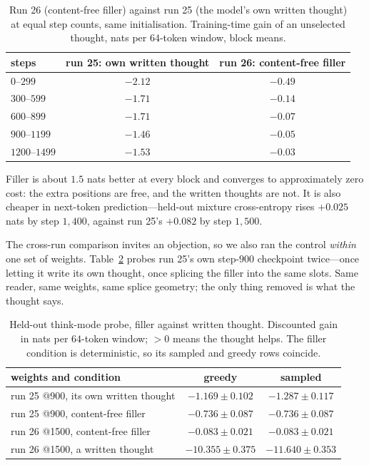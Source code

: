 \documentclass{article} %
\begin{document}
\begin{table}[h]
\centering
\caption{Run 26 (content-free filler) against run 25 (the model's own written thought) at equal step counts, same initialisation. Training-time gain of an unselected thought, nats per $64$-token window, block means.}
\label{tab:run26}
\begin{tabular}{lcc}
\toprule
steps & run 25: own written thought & run 26: content-free filler \\
\midrule
$0$--$299$       & $-2.12$ & $\mathbf{-0.49}$ \\
$300$--$599$     & $-1.71$ & $\mathbf{-0.14}$ \\
$600$--$899$     & $-1.71$ & $\mathbf{-0.07}$ \\
$900$--$1199$    & $-1.46$ & $\mathbf{-0.05}$ \\
$1200$--$1499$   & $-1.53$ & $\mathbf{-0.03}$ \\
\bottomrule
\end{tabular}
\end{table}

Filler is about $1.5$ nats better at every block and converges to approximately zero cost: the extra positions are free, and the written thoughts are not. It is also cheaper in next-token prediction---held-out mixture cross-entropy rises $+0.025$ nats by step $1{,}400$, against run 25's $+0.082$ by step $1{,}500$.

The cross-run comparison invites an objection, so we also ran the control \emph{within} one set of weights. Table~\ref{tab:run26probe} probes run 25's own step-$900$ checkpoint twice---once letting it write its own thought, once splicing the filler into the same slots. Same reader, same weights, same splice geometry; the only thing removed is what the thought says.

\begin{table}[h]
\centering
\caption{Held-out think-mode probe, filler against written thought. Discounted gain in nats per $64$-token window; $>0$ means the thought helps. The filler condition is deterministic, so its sampled and greedy rows coincide.}
\label{tab:run26probe}
\begin{tabular}{lcc}
\toprule
weights and condition & greedy & sampled \\
\midrule
run 25 @900, its own written thought & $-1.169 \pm 0.102$ & $-1.287 \pm 0.117$ \\
run 25 @900, content-free filler     & $-0.736 \pm 0.087$ & $-0.736 \pm 0.087$ \\
run 26 @1500, content-free filler    & $-0.083 \pm 0.021$ & $-0.083 \pm 0.021$ \\
run 26 @1500, a written thought      & $-10.355 \pm 0.375$ & $-11.640 \pm 0.353$ \\
\bottomrule
\end{tabular}
\end{table}
\end{document}
